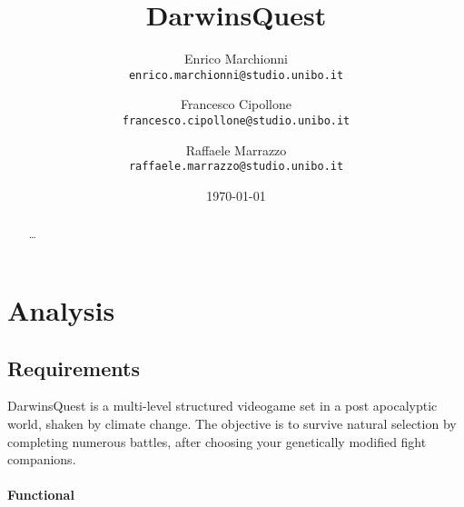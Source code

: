 \documentclass[12pt, a4paper]{report}
\title{DarwinsQuest}
\author{
    Enrico Marchionni\\
    \texttt{enrico.marchionni@studio.unibo.it}
    \and
    Francesco Cipollone\\
    \texttt{francesco.cipollone@studio.unibo.it}
    \and
    Raffaele Marrazzo\\
    \texttt{raffaele.marrazzo@studio.unibo.it}
}
\date{\today}
\begin{document}
\maketitle

\begin{abstract}

    \dots

\end{abstract}

\tableofcontents

\chapter{Analysis}

\section{Requirements}

    DarwinsQuest \cite{ontheoriginofspiecies} is a multi-level structured videogame set in a post apocalyptic world,
    shaken by climate change. The objective is to survive natural selection by completing
    numerous battles, after choosing your genetically modified fight companions.

\subsubsection{Functional}
\end{document}
